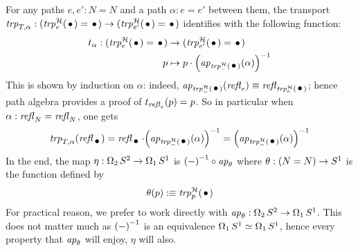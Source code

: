 \documentclass[english,a4]{article}
\begin{document}
For any paths $e,e':N=N$ and a path $\alpha: e=e'$ between them, the
transport
$\trp{T,\alpha}:(\trp[\hopffam]{e}(\base) = \base) \to (\trp[\hopffam]{e'}(\base) =
\base)$ identifies with the following function:
\begin{equation}
  \begin{aligned}
    {t_\alpha}: (\trp[\hopffam]{e}(\base) = \base) &\to (\trp[\hopffam]{e'}(\base) = \base)
    \\
    p &\mapsto p\cdot \inv{\left(\ap{\trp[\hopffam]{\blank}(\base)}(\alpha)\right)}
  \end{aligned}
\end{equation}
This is shown by induction on $\alpha$: indeed,
$\ap{\trp[\hopffam]{\blank}(\base)}(\refl{e}) \jdeq \refl{\trp[\hopffam]{e}(\base)}$; hence
path algebra provides a proof of $t_{\mathop{{\mathit{refl}}_{e}}}(p) = p$. So in
particular when $\alpha:\mathop{{\mathit{refl}}_{N}} = \mathop{{\mathit{refl}}_{N}}$, one gets
\begin{equation}\label{eq:trp-Ta(refl)}
  \trp{T,\alpha}(\refl \base) = \refl \base \cdot \inv{\left(\ap{\trp[\hopffam]{\blank}(\base)}(\alpha)\right)}
  = \inv{\left(\ap{\trp[\hopffam]{\blank}(\base)}(\alpha)\right)}
\end{equation}
In the end, the map $\eta: \operatorname{\Omega_{2}} S^2 \to \operatorname{\Omega_{1}} {S^1}$
is ${(\mathord{-})}^{-1} \circ \mathop{{\it ap}_{\theta}}$ where $\theta : (N=N) \to {S^1}$ is the function defined by
\begin{equation}
  \label{eq:17}
  \theta(p) \defequi \trp[\hopffam]{p}(\base)
\end{equation}
For practical reason, we prefer to work directly with
$\mathop{{\it ap}_{\theta}}: \operatorname{\Omega_{2}} S^2 \to \operatorname{\Omega_{1}} {S^1}$. This does not
matter much as ${(\mathord{-})}^{-1}$ is an equivalence
$\operatorname{\Omega_{1}} {S^1} \simeq \operatorname{\Omega_{1}} {S^1}$, hence every property that
$\mathop{{\it ap}_{\theta}}$ will enjoy, $\eta$ will also.
\end{document}
